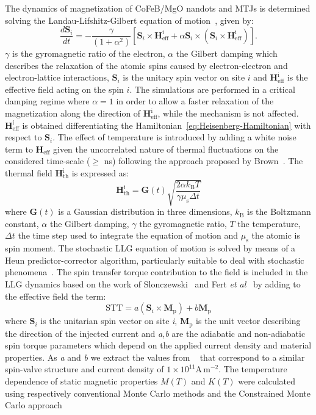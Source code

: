 \documentclass[aps,prb,signlecolumn,preprint,superscriptaddress,10]{revtex4-1}
\newcommand{\smmu}{\ensuremath{\mu_{\mathrm{s}}}\xspace}
\newcommand{\sms}{\ensuremath{\mathbf{S}}\xspace}
\newcommand{\kB}{\ensuremath{k_{\mathrm{B}}}\xspace}
\begin{document}
The dynamics of magnetization of CoFeB/MgO nandots and MTJs is determined solving the Landau-Lifshitz-Gilbert equation of motion~\cite{vampire-rev}, given by:
\begin{equation}
\frac {d \sms_i}{dt} =  - \frac{\gamma}{\left( 1+\alpha^2 \right)}\left[ \sms_i \times \mathrm{\mathbf{H}^i_{eff}} + \alpha \sms_i \times \left( \sms_i \times \mathrm{\mathbf{H}^i_{eff}} \right)\right].
\end{equation}
$\gamma$ is the gyromagnetic ratio of the electron, $\alpha$ the Gilbert damping which describes the relaxation of the atomic spins caused by electron-electron and electron-lattice interactions, $\sms_i$ is the unitary spin vector on site $i$ and $\mathrm{\mathbf{H}^i_{eff}}$ is the effective field acting on the spin $i$. The simulations are performed in a critical damping regime where $\alpha=1$ in order to allow a faster relaxation of the magnetization along the direction of $\mathrm{\mathbf{H}^i_{eff}}$, while the mechanism is not affected. $\mathrm{\mathbf{H}^i_{eff}}$ is obtained differentiating the Hamiltonian~\ref{eq:Heisenberg-Hamiltonian} with respect to $\sms_i$. The effect of temperature is introduced by adding a white noise term to $\mathrm{\mathbf{H}_{eff}}$ given the uncorrelated nature of thermal fluctuations on the considered time-scale ($\geq$ ns) following the approach proposed by Brown~\cite{Brown1979}. The thermal field $\mathrm{\mathbf{H}^i_{th}}$ is expressed as:
\begin{equation}
\mathrm{\mathbf{H}^i_{th}} =  \mathbf{G}\left(t \right)\sqrt{\frac{2\alpha\kB T}{\gamma \smmu \Delta t}}
\end{equation}
where $\mathbf{G}\left(t \right)$ is a Gaussian distribution in three dimensions, \kB is the Boltzmann constant, $\alpha$ the Gilbert damping, $\gamma$ the gyromagnetic ratio, $T$ the temperature, $\Delta t$ the time step used to integrate the equation of motion and \smmu the atomic is spin moment. The stochastic LLG equation of motion is solved by means of a Heun predictor-corrector algorithm, particularly suitable to deal with stochastic phenomena~\cite{vampire-rev}. 
The spin transfer torque contribution to the field is included in the LLG dynamics based on the work of Slonczewski~\cite{Slonczewski1996} and Fert \textit{et al}~\cite{Zhang2002} by adding to the effective field the term:
\begin{equation}
\mathrm{STT} = a \left(\sms_i \times \mathrm{\mathbf{M}_{p}}\right) + b \mathrm{\mathbf{M}_{p}}
\label{eq:STT_slonc}
\end{equation}
where $\sms_i$ is the unitarian spin vector on site \textit{i}, $\mathrm{\mathbf{M}_{p}}$ is the unit vector describing the direction of the injected current and \textit{a,b} are the adiabatic and non-adiabatic spin torque parameters which depend on the applied current density and material properties. As \textit{a} and \textit{b} we extract the values from ~\cite{Zhang2002} that  correspond to a similar spin-valve structure and current density of $1\times 10^{11} \mathrm{A}\,\mathrm{m}^{-2}$.
The temperature dependence of static magnetic properties $M(T)$ and $K(T)$ were calculated using respectively conventional Monte Carlo methods and the Constrained Monte Carlo approach~\cite{CMC_vampire}
\end{document}
